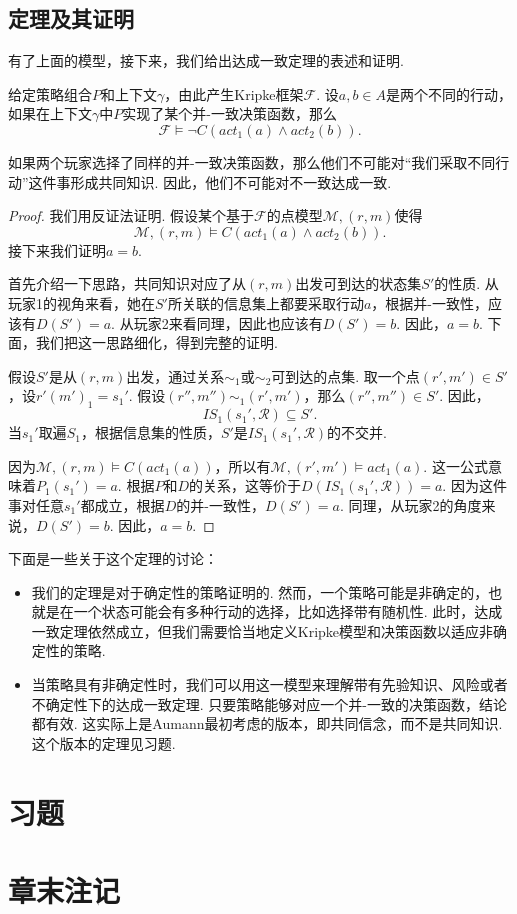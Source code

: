 \subsection{定理及其证明}

有了上面的模型，接下来，我们给出达成一致定理的表述和证明. 

\begin{theorem}[Aumann达成一致定理]
给定策略组合$P$和上下文$\gamma$，由此产生Kripke框架$\mathcal{F}$. 设$a, b \in A$是两个不同的行动，如果在上下文$\gamma$中$P$实现了某个并-一致决策函数，那么
\[
\mathcal{F} \vDash \neg C(act_1(a) \wedge act_2(b)).
\]
\end{theorem}

如果两个玩家选择了同样的并-一致决策函数，那么他们不可能对“我们采取不同行动”这件事形成共同知识. 因此，他们不可能对不一致达成一致. 

\begin{proof}
我们用反证法证明. 假设某个基于$\mathcal{F}$的点模型$\mathcal{M}, (r,m)$使得
\[
\mathcal{M}, (r,m) \vDash C(act_1(a) \wedge act_2(b)).
\]
接下来我们证明$a=b$. 

首先介绍一下思路，共同知识对应了从$(r,m)$出发可到达的状态集$S'$的性质. 从玩家1的视角来看，她在$S'$所关联的信息集上都要采取行动$a$，根据并-一致性，应该有$D(S')=a$. 从玩家2来看同理，因此也应该有$D(S')=b$. 因此，$a=b$. 下面，我们把这一思路细化，得到完整的证明. 

假设$S'$是从$(r,m)$出发，通过关系$\sim_1$或$\sim_2$可到达的点集. 取一个点$(r',m') \in S'$，设$r'(m')_1 = s_1'$. 假设$(r'', m'') \sim_1 (r', m')$，那么$(r'', m'') \in S'$. 因此，
\[
IS_1(s_1', \mathcal{R}) \subseteq S'.
\]
当$s_1'$取遍$S_1$，根据信息集的性质，$S'$是$IS_1(s_1', \mathcal{R})$的不交并. 

因为$\mathcal{M}, (r,m) \vDash C(act_1(a))$，所以有$\mathcal{M}, (r',m') \vDash act_1(a)$. 这一公式意味着$P_1(s_1')=a$. 根据$P$和$D$的关系，这等价于$D(IS_1(s_1', \mathcal{R}))=a$. 因为这件事对任意$s_1'$都成立，根据$D$的并-一致性，$D(S')=a$. 同理，从玩家2的角度来说，$D(S')=b$. 因此，$a=b$. 
\end{proof}

下面是一些关于这个定理的讨论：
\begin{itemize}
    \item 我们的定理是对于确定性的策略证明的. 然而，一个策略可能是非确定的，也就是在一个状态可能会有多种行动的选择，比如选择带有随机性. 此时，达成一致定理依然成立，但我们需要恰当地定义Kripke模型和决策函数以适应非确定性的策略. 
    \item 当策略具有非确定性时，我们可以用这一模型来理解带有先验知识、风险或者不确定性下的达成一致定理. 只要策略能够对应一个并-一致的决策函数，结论都有效. 这实际上是Aumann最初考虑的版本，即共同信念，而不是共同知识. 这个版本的定理见习题. 
\end{itemize}

\section{习题}

\section{章末注记}